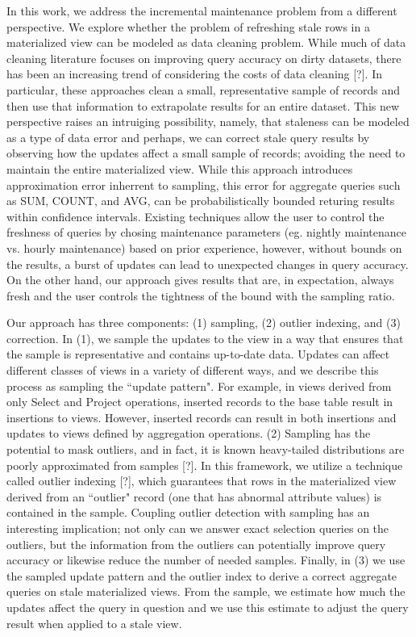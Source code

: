 In this work, we address the incremental maintenance problem from a different perspective.
We explore whether the problem of refreshing stale rows in a materialized view can be modeled as data cleaning problem.
While much of data cleaning literature focuses on improving query accuracy on dirty datasets,
there has been an increasing trend of considering the costs of data cleaning [?].
In particular, these approaches clean a small, representative sample of records and then use that information to extrapolate results for an entire dataset.
This new perspective raises an intruiging possibility, namely, that staleness can be modeled as a type of data error 
and perhaps, we can correct stale query results by observing how the updates affect a small sample of records; 
avoiding the need to maintain the entire materialized view.
While this approach introduces approximation error inherrent to sampling, this error for aggregate queries such as SUM, COUNT, and AVG, 
can be probabilistically bounded returing results within confidence intervals.
Existing techniques allow the user to control the freshness of queries by chosing maintenance parameters (eg. nightly maintenance vs. hourly maintenance) based on prior experience, however, without bounds on the results, a burst of updates can lead to unexpected changes in query accuracy.
On the other hand, our approach gives results that are, in expectation, always fresh and the user controls the tightness of the bound with the sampling ratio.

Our approach has three components: (1) sampling, (2) outlier indexing, and (3) correction. In (1), we sample the updates to the view in a way that ensures that the sample is representative and contains up-to-date data. Updates can affect different classes of views in a variety of different ways, and we describe this process as sampling the ``update pattern". For example, in views derived from only Select and Project operations, inserted records to the base table result in insertions to views. However, inserted records can result in both insertions and updates to views defined by aggregation operations. (2) Sampling has the potential to mask outliers, and in fact, it is known
heavy-tailed distributions are poorly approximated from samples {[}?{]}.
In this framework, we utilize a technique called outlier indexing [?], which guarantees that rows in the materialized view derived from an ``outlier" record (one that has abnormal attribute values) is contained in the sample.
Coupling outlier detection with sampling has an interesting implication; not only can we answer exact selection queries on the outliers, but
the information from the outliers can potentially improve query accuracy or likewise reduce the number of needed samples.
Finally, in (3) we use the sampled update pattern and the outlier index to derive a correct aggregate queries on stale materialized views.
From the sample, we estimate how much the updates affect the query in question and we use this estimate to adjust the query result when applied to a stale view.

